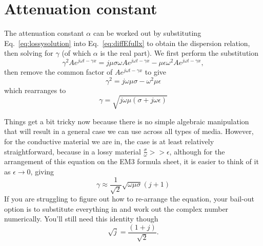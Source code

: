 \documentclass{tufte-handout}
\begin{document}
\section{Attenuation constant}
The attenuation constant $\alpha$ can be worked out by substituting Eq.~\ref{eq:lossysolution} into Eq.~\ref{eq:diffEfullx} to obtain the dispersion relation, then solving for $\gamma$ (of which $\alpha$ is the real part). 
We first perform the substitution
\begin{equation}
\gamma^{2}Ae^{j\omega{}t-\gamma{}x} = j\mu\sigma\omega{}Ae^{j\omega{}t-\gamma{}x} - \mu\epsilon\omega^{2}Ae^{j\omega{}t-\gamma{}x},
\end{equation}
then remove the common factor of $Ae^{j\omega{}t-\gamma{}x}$ to give
\begin{equation}
\gamma^{2} = j\omega\mu\sigma - \omega^{2}\mu\epsilon
\end{equation}
which rearranges to 
\begin{equation}
\gamma = \sqrt{j\omega\mu\left(\sigma + j\omega\epsilon\right)}
\end{equation}

Things get a bit tricky now because there is no simple algebraic manipulation that will result in a general case we can use across all types of media. However, for the conductive material we are in, the case is at least relatively straightforward, because in a lossy material $\frac{\sigma}{\omega} >> \epsilon$, although for the arrangement of this equation on the EM3 formula sheet, it is easier to think of it as $\epsilon \to 0$, giving
\begin{equation}
\gamma \approx \frac{1}{\sqrt{2}}\sqrt{\omega\mu\sigma}(j+1)
\end{equation}
If you are struggling to figure out how to re-arrange the equation, your bail-out option is to substitute everything in and work out the complex number numerically. You'll still need this identity though
\begin{equation} 
\sqrt{j}=\frac{(1+j)}{\sqrt{2}}.
\end{equation}
\end{document}
